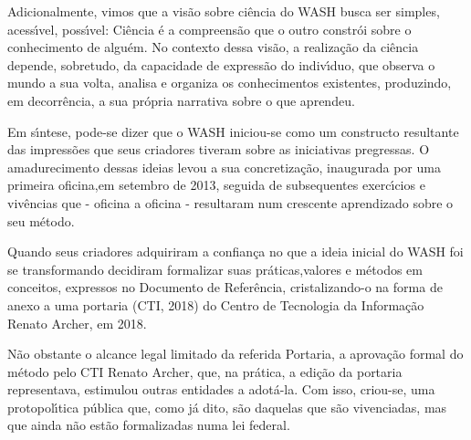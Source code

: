 \documentclass[
12pt,		%
openright,	%
twoside,  %
a4paper,			%
chapter=TITLE,		%
english,			%
french,				%
spanish,			%
brazil				%
]{USPSC-classe/USPSC}
\begin{document}
Adicionalmente, vimos que a vis\~ao sobre ci\^encia do WASH busca ser  simples, acess\'{\i}vel, poss\'{\i}vel: \textquotedbl Ci\^encia \'e a compreens\~ao que o outro constr\'oi sobre o conhecimento de algu\'em\textquotedbl . No contexto dessa vis\~ao, a realiza\c{c}\~ao da ci\^encia depende, sobretudo, da capacidade de express\~ao do indiv\'{\i}duo, que observa o mundo a sua volta, analisa e organiza os conhecimentos existentes, produzindo, em decorr\^encia, a sua pr\'opria narrativa sobre o que aprendeu.

















Em s\'{\i}ntese, pode-se dizer que o WASH iniciou-se como um constructo resultante das impress\~oes que seus criadores tiveram sobre as iniciativas pregressas. O amadurecimento dessas ideias levou a sua concretiza\c{c}\~ao, inaugurada por uma primeira oficina,em setembro de 2013, seguida de subsequentes exerc\'{\i}cios e  viv\^encias que - oficina a oficina - resultaram num crescente aprendizado sobre o seu m\'etodo.

















Quando seus criadores adquiriram a confian\c{c}a no que a ideia inicial do WASH foi se transformando decidiram formalizar suas pr\'aticas,valores e m\'etodos em conceitos, expressos  no Documento de Refer\^encia, cristalizando-o na forma de anexo a uma portaria  (CTI, 2018)  do Centro de Tecnologia da Informa\c{c}\~ao Renato Archer, em 2018.

















N\~ao obstante o alcance legal limitado da referida Portaria, a aprova\c{c}\~ao formal do m\'etodo pelo CTI Renato Archer, que, na pr\'atica, a edi\c{c}\~ao da portaria representava, estimulou outras entidades a adot\'a-la. Com isso, criou-se, uma protopol\'{\i}tica p\'ublica que, como j\'a dito, s\~ao \textquotedbl daquelas que s\~ao vivenciadas, mas que ainda n\~ao est\~ao formalizadas numa lei federal\textquotedbl .
\end{document}
